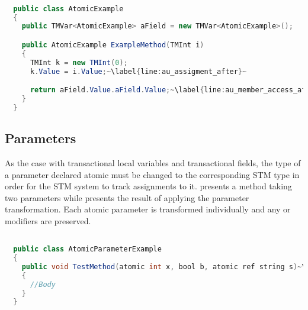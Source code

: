 \begin{lstlisting}[label=lst:after_atomic_usage,
  caption={Usage of \bscode{atomic} Variables After Transformation},
  language=Java,  
  showspaces=false,
  showtabs=false,
  breaklines=true,
  showstringspaces=false,
  breakatwhitespace=true,
  escapechar=~,
  commentstyle=\color{greencomments},
  keywordstyle=\color{bluekeywords},
  stringstyle=\color{redstrings},
  morekeywords={atomic, retry, orelse, var, get, set}]  % Start your code-block

  public class AtomicExample
  {
    public TMVar<AtomicExample> aField = new TMVar<AtomicExample>();

    public AtomicExample ExampleMethod(TMInt i)
    {
      TMInt k = new TMInt(0);
      k.Value = i.Value;~\label{line:au_assigment_after}~

      return aField.Value.aField.Value;~\label{line:au_member_access_after}~
    }
  }
\end{lstlisting}

\subsection{Parameters}
\label{subsec:roslyn_extension_parameters}
As the case with transactional local variables and transactional fields, the type of a parameter declared atomic must be changed to the corresponding \ac{STM} type in order for the \ac{STM} system to track assignments to it.  presents a method taking two  parameters while  presents the result of applying the parameter transformation. Each atomic parameter is transformed individually and any  or  modifiers are preserved.

\begin{lstlisting}[label=lst:before_atomic_parameter,
  caption={\bscode{atomic} Parameters Before Transformation},
  language=Java,  
  showspaces=false,
  showtabs=false,
  breaklines=true,
  showstringspaces=false,
  breakatwhitespace=true,
  escapechar=~,
  commentstyle=\color{greencomments},
  keywordstyle=\color{bluekeywords},
  stringstyle=\color{redstrings},
  morekeywords={atomic, retry, orelse, var, get, set}]  % Start your code-block

  public class AtomicParameterExample
  {
    public void TestMethod(atomic int x, bool b, atomic ref string s)~\label{line:ap_before}~
    {
      //Body
    }
  }
\end{lstlisting}

